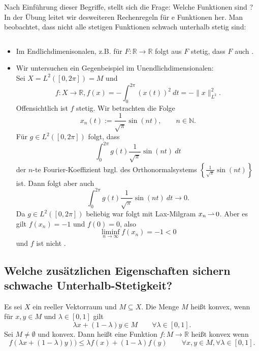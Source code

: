 \documentclass[main.tex]{subfiles}
\begin{document}
\setcounter{chapter}{2}
\setcounter{satz}{5}
Nach Einführung dieser Begriffe, stellt sich die Frage: Welche Funktionen sind \suhs{}?
In der Übung leitet wir desweiteren Rechenregeln für \suhs{}e Funktionen her.
Man beobachtet, dass nicht alle stetigen Funktionen schwach unterhalb stetig sind:

\begin{bsp}\label{2.6}$ $\\[-1em]
\begin{itemize}
\item Im Endlichdimenisonalen, z.B. für $F\colon ℝ\to ℝ$ folgt aus $F$ stetig, dass $F$ auch \suhs{}.
\item Wir untersuchen ein Gegenbeispiel im Unendlichdimensionalen:\\
Sei $X = L^2([0,2π]) = M$ und 
$$f\colon X\to ℝ, f(x) = -\int_0^{2π} \left(x(t)\right)^2~dt = -\| x\|_{L^2}^2.$$
Offensichtlich ist $f$ stetig.
Wir betrachten die Folge
$$x_n(t) := \frac{1}{\sqrt{π}} \sin (nt), \qquad n\in ℕ.$$
Für $g\in L^2([0,2π])$ folgt, dass
$$\int_0^{2π} g(t) \frac{1}{\sqrt{π}}\sin(nt)~dt$$
der $n$-te Fourier-Koeffizient bzgl. des Orthonormalsystems $\left\{ \frac{1}{\sqrt{π}}\sin(nt)\right\}$ ist. Dann folgt aber auch
$$\int_0^{2π} g(t) \frac{1}{\sqrt{π}} \sin (nt)~dt \to 0.$$
Da $g\in L^2([0,2π])$ beliebig war folgt mit Lax-Milgram $x_n \operatorname{\rightharpoonup} 0$.
Aber es gilt $f(x_n) = -1$ und $f(0) = 0$, also
$$\liminf_{n\to ∞} f(x_n) = -1 < 0$$
und $f$ ist nicht \suhs{}.  
\end{itemize}
\end{bsp}

\subsection*{Welche zusätzlichen Eigenschaften sichern schwache Unterhalb-Stetigkeit?}

\begin{mydef}\label{2.7}
Es sei $X$ ein reeller Vektorraum und $M\subseteq X$.
Die Menge $M$ heißt konvex, wenn für $x,y\in M$ und $λ\in [0,1]$ gilt
$$λx + (1-λ) y \in M\qquad ∀λ\in [0,1].$$
Sei $M\ne ∅$ und konvex. Dann heißt eine Funktion $f\colon M\to ℝ$ heißt konvex wenn
$$f(λx + (1-λ)y)) \le λf(x) + (1-λ) f(y) \qquad ∀ x,y\in M, ∀λ\in [0,1].$$
\end{mydef}
\end{document}
